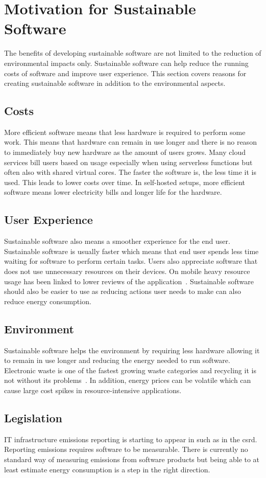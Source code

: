 \section{Motivation for Sustainable Software}
The benefits of developing sustainable software are not limited to the reduction of environmental impacts only. Sustainable software can help reduce the running costs of software and improve user experience. This section covers reasons for creating sustainable software in addition to the environmental aspects.

\subsection{Costs}
More efficient software means that less hardware is required to perform some work. This means that hardware can remain in use longer and there is no reason to immediately buy new hardware as the amount of users grows. Many cloud services bill users based on usage especially when using serverless functions but often also with shared virtual cores. The faster the software is, the less time it is used. This leads to lower costs over time. In self-hosted setups, more efficient software means lower electricity bills and longer life for the hardware.

\subsection{User Experience}
Sustainable software also means a smoother experience for the end user. Sustainable software is usually faster which means that end user spends less time waiting for software to perform certain tasks. Users also appreciate software that does not use unnecessary resources on their devices. On mobile heavy resource usage has been linked to lower reviews of the application~\cite{mobilecomplaints}. Sustainable software should also be easier to use as reducing actions user needs to make can also reduce energy consumption.

\subsection{Environment}
Sustainable software helps the environment by requiring less hardware allowing it to remain in use longer and reducing the energy needed to run software. Electronic waste is one of the fastest growing waste categories and recycling it is not without its problems~\cite{whoElectronicWaste}. In addition, energy prices can be volatile which can cause large cost spikes in resource-intensive applications.

\subsection{Legislation}
IT infrastructure emissions reporting is starting to appear in such as in the \gls{csrd}. Reporting emissions requires software to be measurable. There is currently no standard way of measuring emissions from software products but being able to at least estimate energy consumption is a step in the right direction.
